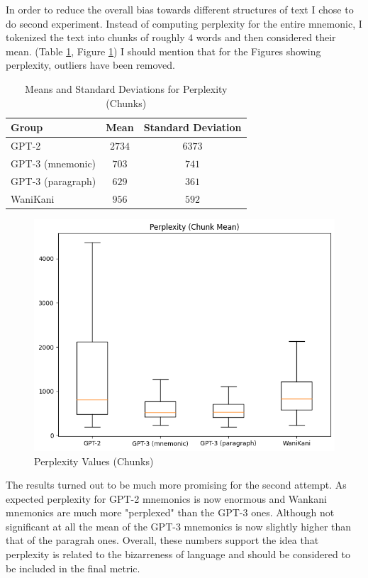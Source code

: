 In order to reduce the overall bias towards different structures of text I chose to do second experiment. Instead of computing perplexity for the entire mnemonic, I tokenized the text into chunks of roughly $4$ words and then considered their mean. (Table \ref{tab:ppl_4_chunks}, Figure \ref{figure:ppl_4_chunks}) I should mention that for the Figures showing perplexity, outliers have been removed.
\begin{table}[ht] 
\centering
\caption{Means and Standard Deviations for Perplexity (Chunks)}
\label{table:group_stats}
\begin{tabular}{lcc}
\toprule
Group & Mean & Standard Deviation \\
\midrule
GPT-2& $2734$ & $6373$ \\
GPT-3 (mnemonic) & $703$ & $741$ \\
GPT-3 (paragraph)& $629$ & $361$ \\
WaniKani & $956$ & $592$ \\
\bottomrule
\end{tabular}
\label{tab:ppl_4_chunks}
\end{table}
\begin{figure}
    \centering
    \includegraphics[width=400pt]{resources/ppl_4_chunks.png}
    \caption{Perplexity Values (Chunks)}
    \label{figure:ppl_4_chunks}
\end{figure}

The results turned out to be much more promising for the second attempt. As expected perplexity for GPT-2 mnemonics is now enormous and Wankani mnemonics are much more "perplexed" than the GPT-3 ones. Although not significant at all the mean of the GPT-3 mnemonics is now slightly higher than that of the paragrah ones. Overall, these numbers support the idea that perplexity is related to the bizarreness of language and should be considered to be included in the final metric. 

